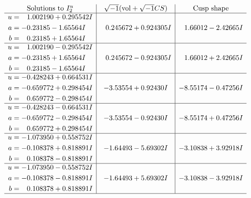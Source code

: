 \documentclass[1p]{elsarticle_modified}
\theoremstyle{definition}
\newcommand{\I}{\sqrt{-1}}
\begin{document}
$$\begin{array}{c|c|c}  
\text{Solutions to }I^u_{2}& \I (\text{vol} + \sqrt{-1}CS) & \text{Cusp shape}\\
 \hline 
\begin{aligned}
u &= \phantom{-}1.002190 + 0.295542 I \\
a &= -0.23185 - 1.65564 I \\
b &= \phantom{-}0.23185 + 1.65564 I\end{aligned}
 & \phantom{-}0.245672 + 0.924305 I & \phantom{-}1.66012 - 2.42665 I \\ \hline\begin{aligned}
u &= \phantom{-}1.002190 - 0.295542 I \\
a &= -0.23185 + 1.65564 I \\
b &= \phantom{-}0.23185 - 1.65564 I\end{aligned}
 & \phantom{-}0.245672 - 0.924305 I & \phantom{-}1.66012 + 2.42665 I \\ \hline\begin{aligned}
u &= -0.428243 + 0.664531 I \\
a &= -0.659772 + 0.298454 I \\
b &= \phantom{-}0.659772 - 0.298454 I\end{aligned}
 & -3.53554 + 0.92430 I & -8.55174 - 0.47256 I \\ \hline\begin{aligned}
u &= -0.428243 - 0.664531 I \\
a &= -0.659772 - 0.298454 I \\
b &= \phantom{-}0.659772 + 0.298454 I\end{aligned}
 & -3.53554 - 0.92430 I & -8.55174 + 0.47256 I \\ \hline\begin{aligned}
u &= -1.073950 + 0.558752 I \\
a &= -0.108378 + 0.818891 I \\
b &= \phantom{-}0.108378 - 0.818891 I\end{aligned}
 & -1.64493 - 5.69302 I & -3.10838 + 3.92918 I \\ \hline\begin{aligned}
u &= -1.073950 - 0.558752 I \\
a &= -0.108378 - 0.818891 I \\
b &= \phantom{-}0.108378 + 0.818891 I\end{aligned}
 & -1.64493 + 5.69302 I & -3.10838 - 3.92918 I\\
 \hline 
 \end{array}$$\newpage
\end{document}
